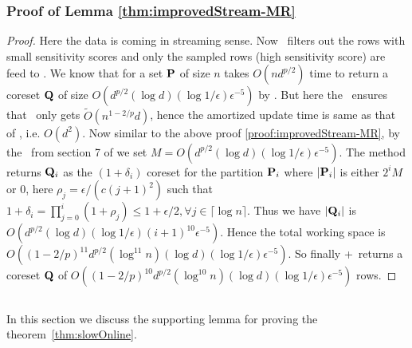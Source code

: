 \subsubsection{Proof of Lemma \ref{thm:improvedStream-MR}}
\begin{proof}\label{proof:improvedStream-MR}
 Here the data is coming in streaming sense. Now \online~filters out the rows with small sensitivity scores and only the sampled rows (high sensitivity score) are feed to \mrlw. We know that for a set $\mathbf{P}$ of size $n$ takes $O(nd^{p/2})$ time to return a coreset $\mathbf{Q}$ of size $O(d^{p/2}(\log d)(\log 1/\epsilon)\epsilon^{-5})$ by \cite{cohen2015p}. But here the \online~ensures that \mrlw~only gets $\tilde{O}(n^{1-2/p}d)$, hence the amortized update time is same as that of \online, i.e. $O(d^{2})$. Now similar to the above proof \ref{proof:improvedStream-MR}, by the \mrlw~from section 7 of \cite{har2004coresets} we set $M=O(d^{p/2}(\log d)(\log 1/\epsilon)\epsilon^{-5})$. The method returns $\mathbf{Q}_{i}$ as the $(1 + \delta_{i})$ coreset for the partition $\mathbf{P}_{i}$ where $|\mathbf{P}_{i}|$ is either $2^{i}M$ or $0$, here $\rho_{j} = \epsilon/(c(j+1)^{2})$ such that $1+\delta_{i} = \prod_{j=0}^{i} (1 + \rho_{j}) \leq 1 + \epsilon/2, \forall j \in \lceil \log n \rceil$. Thus we have $|\mathbf{Q}_{i}|$ is $O(d^{p/2}(\log d)(\log 1/\epsilon)(i+1)^{10}\epsilon^{-5})$. Hence the total working space is $O((1-2/p)^{11}d^{p/2}(\log^{11} n)(\log d)(\log 1/\epsilon)\epsilon^{-5})$. So finally \online+\mrlw~returns a coreset $\mathbf{Q}$ of $O((1-2/p)^{10}d^{p/2}(\log^{10} n)(\log d)(\log 1/\epsilon)\epsilon^{-5})$ rows.
\end{proof}
% 
\subsection{}
In this section we discuss the supporting lemma for proving the theorem~\ref{thm:slowOnline}. 
